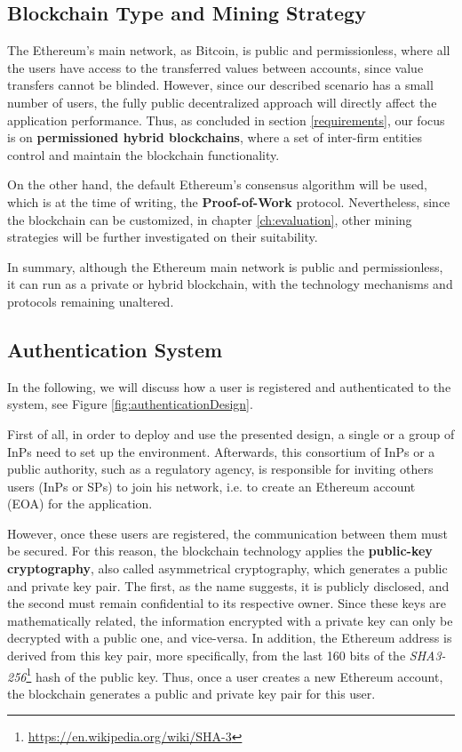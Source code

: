 \subsection{Blockchain Type and Mining Strategy}

The Ethereum's main network, as Bitcoin, is public and permissionless, where all the users have access to the transferred values between accounts, since value transfers cannot be blinded. However, since our described scenario has a small number of users, the fully public decentralized approach will directly affect the application performance. Thus, as concluded in section \ref{requirements}, our focus is on \textbf{permissioned hybrid blockchains}, where a set of inter-firm entities control and maintain the blockchain functionality.

On the other hand, the default Ethereum's consensus algorithm will be used, which is at the time of writing, the \textbf{Proof-of-Work} protocol. Nevertheless, since the blockchain can be customized, in chapter \ref{ch:evaluation}, other mining strategies will be further investigated on their suitability.

In summary, although the Ethereum main network is public and permissionless, it can run as a private or hybrid blockchain, with the technology mechanisms and protocols remaining unaltered.

\subsection{Authentication System} \label{authenticationSystem}

In the following, we will discuss how a user is registered and authenticated to the system, see Figure \ref{fig:authenticationDesign}.

First of all, in order to deploy and use the presented design, a single or a group of InPs need to set up the environment. Afterwards, this consortium of InPs or a public authority, such as a regulatory agency, is responsible for inviting others users (InPs or SPs) to join his network, i.e. to create an Ethereum account (EOA) for the application. 

However, once these users are registered, the communication between them must be secured. For this reason, the blockchain technology applies the \textbf{public-key cryptography}, also called asymmetrical cryptography, which generates a public and private key pair. The first, as the name suggests, it is publicly disclosed, and the second must remain confidential to its respective owner. Since these keys are mathematically related, the information encrypted with a private key can only be decrypted with a public one, and vice-versa. In addition, the Ethereum address is derived from this key pair, more specifically, from the last 160 bits of the \textit{SHA3-256}\footnote{\url{https://en.wikipedia.org/wiki/SHA-3}} hash of the public key. Thus, once a user creates a new Ethereum account, the blockchain generates a public and private key pair for this user.

